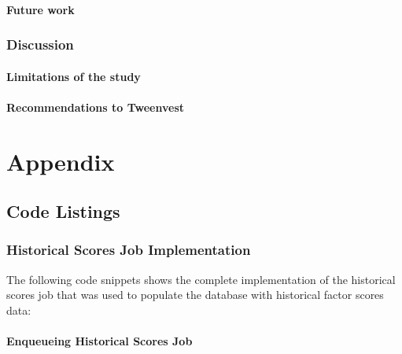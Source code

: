 \documentclass[11pt,english,a4paper,hidelinks]{book}
\begin{document}
\subsection{Future work}


\section{Discussion}
\subsection{Limitations of the study}

\subsection{Recommendations to Tweenvest}



\printbibliography[heading=bibintoc, title=Bibliography]
\label{sec:biblio}
\newpage

\part{Appendix}

\chapter{Code Listings}
\section{Historical Scores Job Implementation}
\label{app:historical_scores_job}

\noindent The following code snippets shows the complete implementation of the historical scores job that was used to populate the database with historical factor scores data:

\subsection{Enqueueing Historical Scores Job}
\end{document}
